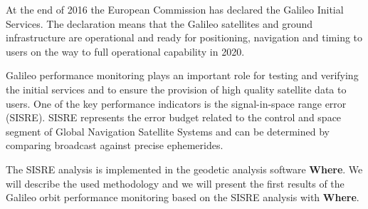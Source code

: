 At the end of 2016 the European Commission has declared the Galileo Initial Services. The declaration means that the Galileo satellites and ground infrastructure are operational and ready for positioning, navigation and timing to users on the way to full operational capability in 2020.

Galileo performance monitoring plays an important role for testing and verifying the initial services and to ensure the provision of high quality satellite data to users. One of the key performance indicators is the signal-in-space range error (SISRE). SISRE represents the error budget related to the control and space segment of Global Navigation Satellite Systems and can be determined by comparing broadcast against precise ephemerides.

The SISRE analysis is implemented in the geodetic analysis software \textbf{Where}. We will describe the used methodology and we will present the first results of the Galileo orbit performance monitoring based on the SISRE analysis with \textbf{Where}.

\vspace{2cm}
\endinput
